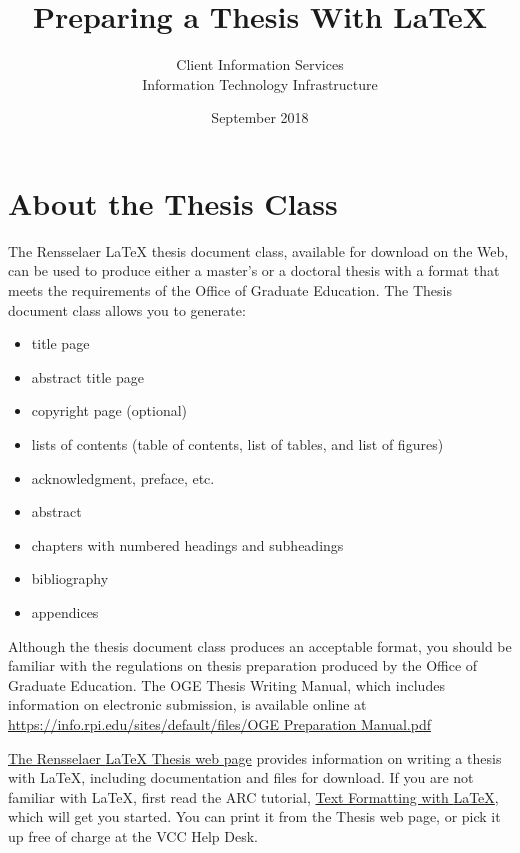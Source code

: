 \documentclass[letterpaper,11pt]{article}
\begin{document}
\title{Preparing a Thesis With \LaTeX}
\author{Client Information Services\\
Information Technology Infrastructure}
\date{September 2018}

\maketitle

\tableofcontents        

\newpage

\section{About the Thesis Class}

The Rensselaer {\LaTeX} thesis document class, available for download on the Web, can be used
to produce either a master's or a doctoral thesis with a format that meets the requirements of
the Office of Graduate Education.
The Thesis document class allows you to generate:
\begin{itemize}
   \item title page
   \item abstract title page
   \item copyright page (optional)
   \item lists of contents (table of contents, list of tables, and list of figures)
   \item acknowledgment, preface, etc.
   \item abstract
   \item chapters with numbered headings and subheadings
   \item bibliography
   \item appendices
\end{itemize}

Although the thesis document class produces an acceptable format, you should be familiar
with the regulations on thesis preparation produced by the Office of Graduate Education. The
OGE Thesis Writing Manual, which includes information on electronic submission, is available
online at
\url{https://info.rpi.edu/sites/default/files/OGE Preparation Manual.pdf}

\href{https://dotcio.rpi.edu/services/printing-publishing/thesis-preparation}{The Rensselaer {\LaTeX} Thesis web page}
provides information on writing a thesis with {\LaTeX},
including documentation and files for download.
If you are not
familiar with {\LaTeX}, first read the ARC tutorial,
\href{http://www.rpi.edu/dept/arc/docs/latex/latex-intro.pdf}{Text Formatting with {\LaTeX}},
which will get you started. You can print it from the Thesis web page, or pick it up
free of charge at the VCC Help Desk.
\end{document}
